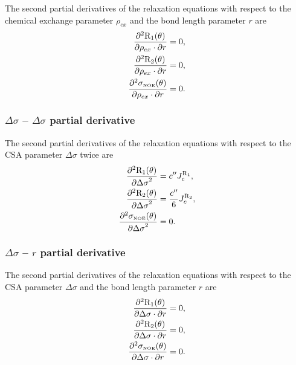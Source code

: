 The second partial derivatives of the relaxation equations with respect to the chemical exchange parameter $\rho_{ex}$ and the bond length parameter $r$ are
\begin{subequations}
\begin{align}
    \frac{\partial^2 \mathrm{R}_1(\theta)}{\partial \rho_{ex} \cdot \partial r} &= 0,           \label{eq: Ri': d2R1/dRex.dr} \\
    \frac{\partial^2 \mathrm{R}_2(\theta)}{\partial \rho_{ex} \cdot \partial r} &= 0,           \label{eq: Ri': d2R2/dRex.dr} \\
    \frac{\partial^2 \sigma_{\scriptscriptstyle \mathrm{NOE}}(\theta)}{\partial \rho_{ex} \cdot \partial r} &= 0.    \label{eq: Ri': d2sigmaNOE/dRex.dr}
\end{align}
\end{subequations}


\subsubsection{$\Delta\sigma$ -- $\Delta\sigma$ partial derivative}

The second partial derivatives of the relaxation equations with respect to the CSA parameter $\Delta\sigma$ twice are
\begin{subequations}
\begin{align}
    \frac{\partial^2 \mathrm{R}_1(\theta)}{{\partial \Delta\sigma}^2} &= c'' J_c^{\mathrm{R}_1},              \label{eq: Ri': d2R1/dCSA2} \\
    \frac{\partial^2 \mathrm{R}_2(\theta)}{{\partial \Delta\sigma}^2} &= \frac{c''}{6} J_c^{\mathrm{R}_2},    \label{eq: Ri': d2R2/dCSA2} \\
    \frac{\partial^2 \sigma_{\scriptscriptstyle \mathrm{NOE}}(\theta)}{{\partial \Delta\sigma}^2} &= 0.                   \label{eq: Ri': d2sigmaNOE/dCSA2}
\end{align}
\end{subequations}


\subsubsection{$\Delta\sigma$ -- $r$ partial derivative}

The second partial derivatives of the relaxation equations with respect to the CSA parameter $\Delta\sigma$ and the bond length parameter $r$ are
\begin{subequations}
\begin{align}
    \frac{\partial^2 \mathrm{R}_1(\theta)}{\partial \Delta\sigma \cdot \partial r} &= 0,         \label{eq: Ri': d2R1/dCSA.dr} \\
    \frac{\partial^2 \mathrm{R}_2(\theta)}{\partial \Delta\sigma \cdot \partial r} &= 0,         \label{eq: Ri': d2R2/dCSA.dr} \\
    \frac{\partial^2 \sigma_{\scriptscriptstyle \mathrm{NOE}}(\theta)}{\partial \Delta\sigma \cdot \partial r} &= 0.  \label{eq: Ri': d2sigmaNOE/dCSA.dr}
\end{align}
\end{subequations}


